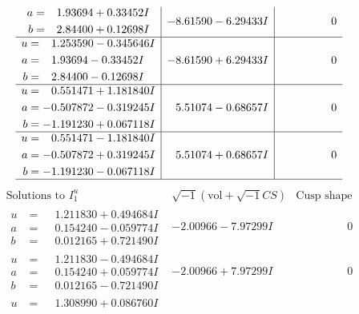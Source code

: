 \documentclass[1p]{elsarticle_modified}
\theoremstyle{definition}
\newcommand{\I}{\sqrt{-1}}
\begin{document}
$$\begin{array}{c|c|c}
\begin{aligned}
a &= \phantom{-}1.93694 + 0.33452 I \\
b &= \phantom{-}2.84400 + 0.12698 I\end{aligned}
 & -8.61590 - 6.29433 I & \phantom{-0.000000 } 0 \\ \hline\begin{aligned}
u &= \phantom{-}1.253590 - 0.345646 I \\
a &= \phantom{-}1.93694 - 0.33452 I \\
b &= \phantom{-}2.84400 - 0.12698 I\end{aligned}
 & -8.61590 + 6.29433 I & \phantom{-0.000000 } 0 \\ \hline\begin{aligned}
u &= \phantom{-}0.551471 + 1.181840 I \\
a &= -0.507872 - 0.319245 I \\
b &= -1.191230 + 0.067118 I\end{aligned}
 & \phantom{-}5.51074 - 0.68657 I & \phantom{-0.000000 } 0 \\ \hline\begin{aligned}
u &= \phantom{-}0.551471 - 1.181840 I \\
a &= -0.507872 + 0.319245 I \\
b &= -1.191230 - 0.067118 I\end{aligned}
 & \phantom{-}5.51074 + 0.68657 I & \phantom{-0.000000 } 0\\
 \hline 
 \end{array}$$\newpage$$\begin{array}{c|c|c}  
\text{Solutions to }I^u_{1}& \I (\text{vol} + \sqrt{-1}CS) & \text{Cusp shape}\\
 \hline 
\begin{aligned}
u &= \phantom{-}1.211830 + 0.494684 I \\
a &= \phantom{-}0.154240 - 0.059774 I \\
b &= \phantom{-}0.012165 + 0.721490 I\end{aligned}
 & -2.00966 - 7.97299 I & \phantom{-0.000000 } 0 \\ \hline\begin{aligned}
u &= \phantom{-}1.211830 - 0.494684 I \\
a &= \phantom{-}0.154240 + 0.059774 I \\
b &= \phantom{-}0.012165 - 0.721490 I\end{aligned}
 & -2.00966 + 7.97299 I & \phantom{-0.000000 } 0 \\ \hline\begin{aligned}
u &= \phantom{-}1.308990 + 0.086760 I \\

\end{aligned}
\end{array}$$
\end{document}
